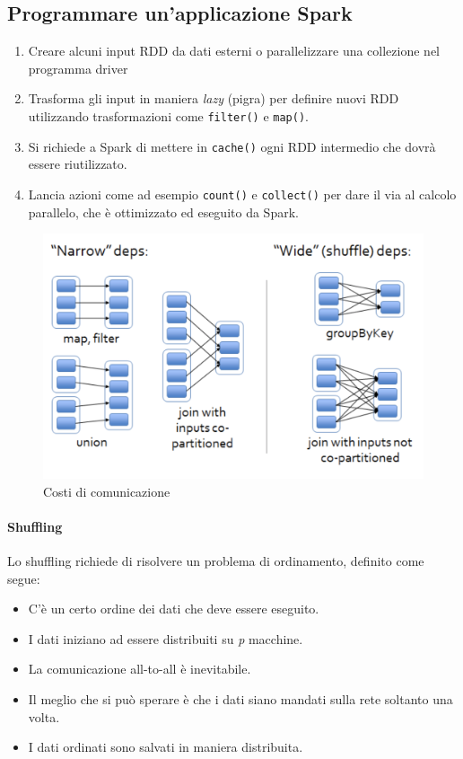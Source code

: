\documentclass{article}
\begin{document}
\begin{appendices}
\subsection{Programmare un'applicazione Spark}
\begin{enumerate}
    \item Creare alcuni input RDD da dati esterni o parallelizzare una collezione nel programma driver
    \item Trasforma gli input in maniera \textit{lazy} (pigra) per definire nuovi RDD utilizzando trasformazioni come \texttt{filter()} e \texttt{map()}.
    \item Si richiede a Spark di mettere in \texttt{cache()} ogni RDD intermedio che dovrà essere riutilizzato.
    \item Lancia azioni come ad esempio \texttt{count()} e \texttt{collect()} per dare il via al calcolo parallelo, che è ottimizzato ed eseguito da Spark.
\end{enumerate}

\begin{figure}[H]
    \centering
    \includegraphics[scale=0.3]{img/Spark costi di comunicazione.png}
    \caption{Costi di comunicazione}
\end{figure}\noindent

\paragraph{Shuffling}
Lo shuffling richiede di risolvere un problema di ordinamento, definito come segue: 
\begin{itemize}
    \item C'è un certo ordine dei dati che deve essere eseguito.
    \item I dati iniziano ad essere distribuiti su \textit{p} macchine.
    \item La comunicazione all-to-all è inevitabile.
    \item Il meglio che si può sperare è che i dati siano mandati sulla rete soltanto una volta.
    \item I dati ordinati sono salvati in maniera distribuita.
\end{itemize}


\end{appendices}
\end{document}
